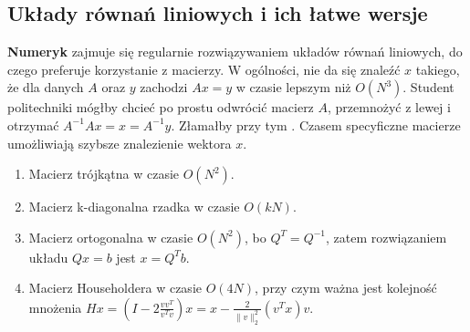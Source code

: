 \subsection{Układy równań liniowych i ich łatwe wersje}
\textbf{Numeryk} zajmuje się regularnie rozwiązywaniem układów równań liniowych, do czego preferuje korzystanie z macierzy. W ogólności, nie da się znaleźć $x$ takiego, że dla danych $A$ oraz $y$ zachodzi $Ax=y$ w czasie lepszym niż $O(N^3)$. Student politechniki mógłby chcieć po prostu odwrócić macierz $A$, przemnożyć z lewej i otrzymać $A^{-1}Ax=x=A^{-1}y$. Złamałby przy tym . Czasem specyficzne macierze umożliwiają szybsze znalezienie wektora $x$.
\begin{enumerate}
    \item Macierz trójkątna w czasie $O(N^2)$.
    \item Macierz k-diagonalna rzadka w czasie $O(kN)$.
    \item Macierz ortogonalna w czasie $O(N^2)$, bo $Q^T=Q^{-1}$, zatem rozwiązaniem układu $Qx=b$ jest $x=Q^Tb$.
    \item Macierz Householdera w czasie $O(4N)$, przy czym ważna jest kolejność mnożenia $Hx=\left(I-2\frac{vv^T}{v^Tv}  \right)x = x - \frac{2}{\|v\|_2^2}(v^Tx)v$.
\end{enumerate}

